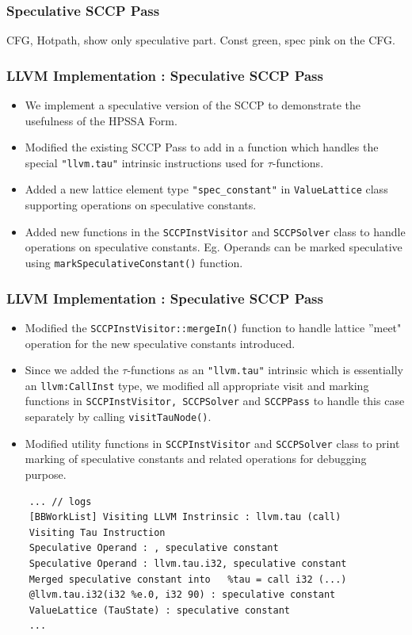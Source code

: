 \documentclass[aspectratio=169]{beamer}
\begin{document}
\begin{frame}
	\frametitle{Speculative SCCP Pass}
	CFG, Hotpath, show only speculative part. Const green, spec pink on the CFG. 
\end{frame}
\begin{frame}
	\frametitle{LLVM Implementation : Speculative SCCP Pass}
	\begin{itemize}
		\item We implement a speculative version of the SCCP to demonstrate the usefulness of the HPSSA Form.
		\item Modified the existing SCCP Pass to add in a function which handles the special \texttt{"llvm.tau"} intrinsic instructions used for $\tau$-functions.
		\item Added a new lattice element type \texttt{"spec_constant"} in \texttt{ValueLattice} class supporting operations on speculative constants.
		\item Added new functions in the \texttt{SCCPInstVisitor} and \texttt{SCCPSolver} class to handle operations on speculative constants. Eg. Operands can be marked speculative using \texttt{markSpeculativeConstant()} function.
	\end{itemize}
\end{frame}
\footnotesize
\begin{frame}[fragile]
	\frametitle{LLVM Implementation : Speculative SCCP Pass}
	\begin{itemize}
		\item Modified the \texttt{SCCPInstVisitor::mergeIn()} function to handle lattice ''meet" operation for the new speculative constants introduced.  
		\item Since we added the $\tau$-functions as an \texttt{"llvm.tau"} intrinsic which is essentially an \texttt{llvm:CallInst} type, we modified all appropriate visit and marking functions in \texttt{SCCPInstVisitor, SCCPSolver} and \texttt{SCCPPass} to handle this case separately by calling \texttt{visitTauNode()}.
		\item Modified utility functions in \texttt{SCCPInstVisitor} and \texttt{SCCPSolver} class to print marking of speculative constants and related operations for debugging purpose.
	\end{itemize}
	\begin{verbatim}
	... // logs
	[BBWorkList] Visiting LLVM Instrinsic : llvm.tau (call)
	Visiting Tau Instruction
	Speculative Operand : , speculative constant
	Speculative Operand : llvm.tau.i32, speculative constant
	Merged speculative constant into   %tau = call i32 (...) 
	@llvm.tau.i32(i32 %e.0, i32 90) : speculative constant
	ValueLattice (TauState) : speculative constant
	...
	\end{verbatim}
\end{frame}
\end{document}
